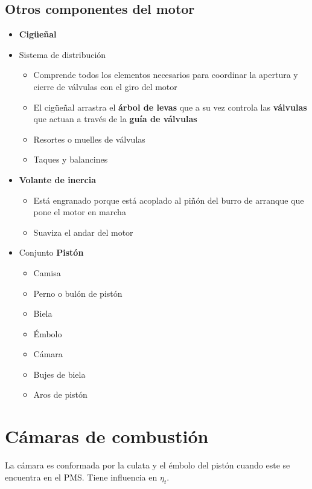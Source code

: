 \subsection{Otros componentes del motor}
\begin{itemize}
\item \textbf{Cigüeñal}
\item Sistema de distribución
\begin{itemize}
\item Comprende todos los elementos necesarios para coordinar la apertura y cierre de válvulas con el giro del motor
\item El cigüeñal arrastra el \textbf{árbol de levas} que a su vez controla las \textbf{válvulas} que actuan a través de la \textbf{guía de válvulas}
\item Resortes o muelles de válvulas
\item Taques y balancines
\end{itemize}
\item \textbf{Volante de inercia}
\begin{itemize}
\item Está engranado porque está acoplado al piñón del burro de arranque que pone el motor en marcha
\item Suaviza el andar del motor
\end{itemize}
\item Conjunto \textbf{Pistón}
\begin{itemize}
\item Camisa
\item Perno o bulón de pistón
\item Biela
\item Émbolo
\item Cámara
\item Bujes de biela
\item Aros de pistón
\end{itemize}
\end{itemize}
\section{Cámaras de combustión}
La cámara es conformada por la culata y el émbolo del pistón cuando este se encuentra en el PMS. Tiene influencia en $\eta_t$. 


